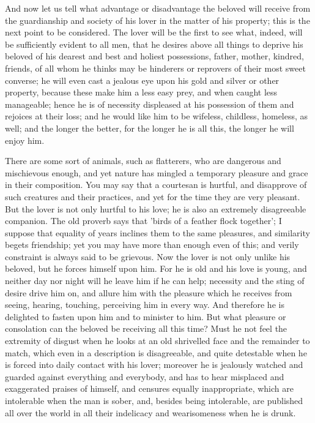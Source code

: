 \documentclass[11pt,letter]{article}
\begin{document}
\par  And now let us tell what advantage or disadvantage the beloved will receive from the guardianship and society of his lover in the matter of his property; this is the next point to be considered. The lover will be the first to see what, indeed, will be sufficiently evident to all men, that he desires above all things to deprive his beloved of his dearest and best and holiest possessions, father, mother, kindred, friends, of all whom he thinks may be hinderers or reprovers of their most sweet converse; he will even cast a jealous eye upon his gold and silver or other property, because these make him a less easy prey, and when caught less manageable; hence he is of necessity displeased at his possession of them and rejoices at their loss; and he would like him to be wifeless, childless, homeless, as well; and the longer the better, for the longer he is all this, the longer he will enjoy him.

\par  There are some sort of animals, such as flatterers, who are dangerous and mischievous enough, and yet nature has mingled a temporary pleasure and grace in their composition. You may say that a courtesan is hurtful, and disapprove of such creatures and their practices, and yet for the time they are very pleasant. But the lover is not only hurtful to his love; he is also an extremely disagreeable companion. The old proverb says that 'birds of a feather flock together'; I suppose that equality of years inclines them to the same pleasures, and similarity begets friendship; yet you may have more than enough even of this; and verily constraint is always said to be grievous. Now the lover is not only unlike his beloved, but he forces himself upon him. For he is old and his love is young, and neither day nor night will he leave him if he can help; necessity and the sting of desire drive him on, and allure him with the pleasure which he receives from seeing, hearing, touching, perceiving him in every way. And therefore he is delighted to fasten upon him and to minister to him. But what pleasure or consolation can the beloved be receiving all this time? Must he not feel the extremity of disgust when he looks at an old shrivelled face and the remainder to match, which even in a description is disagreeable, and quite detestable when he is forced into daily contact with his lover; moreover he is jealously watched and guarded against everything and everybody, and has to hear misplaced and exaggerated praises of himself, and censures equally inappropriate, which are intolerable when the man is sober, and, besides being intolerable, are published all over the world in all their indelicacy and wearisomeness when he is drunk.
\end{document}
